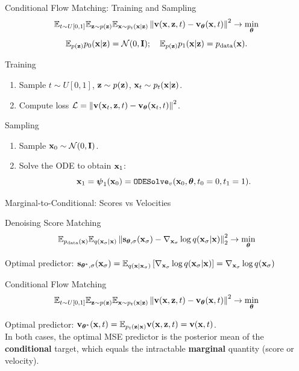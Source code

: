 \documentclass{beamer}
\renewcommand{\eqpause}{}
\begin{document}
\begin{frame}{Conditional Flow Matching: Training and Sampling}
	\[
		\mathbb{E}_{t \sim U[0, 1]} \mathbb{E}_{\mathbf{z} \sim p(\mathbf{z})} \mathbb{E}_{\mathbf{x} \sim p_t(\mathbf{x} | \mathbf{z})}\left\| \mathbf{v}(\mathbf{x}, \mathbf{z}, t) - \mathbf{v}_{\boldsymbol{\theta}}(\mathbf{x}, t) \right\|^2 \rightarrow \min_{\boldsymbol{\theta}}
	\]
	\[
		\mathbb{E}_{p(\mathbf{z})} p_0(\mathbf{x} | \mathbf{z}) = \mathcal{N}(0, \mathbf{I}); \quad \mathbb{E}_{p(\mathbf{z})} p_1(\mathbf{x} | \mathbf{z}) = p_{\text{data}}(\mathbf{x}).
	\]
	\eqpause
	\vspace{-0.3cm}
	\begin{block}{Training}
		\begin{enumerate}
			\item Sample $t \sim U[0, 1]$, $\mathbf{z} \sim p(\mathbf{z})$, $\mathbf{x}_t \sim p_t(\mathbf{x} | \mathbf{z})$.
			\item Compute loss $ \mathcal{L} = \left\| \mathbf{v}(\mathbf{x}_t, \mathbf{z}, t) - \mathbf{v}_{\boldsymbol{\theta}}(\mathbf{x}_t, t) \right\|^2 $.
		\end{enumerate}
	\end{block}
	\eqpause
	\begin{block}{Sampling}
		\begin{enumerate}
			\item Sample $\mathbf{x}_0 \sim \mathcal{N}(0, \mathbf{I})$.
			\item Solve the ODE to obtain $\mathbf{x}_1$:
			\vspace{-0.3cm}
			\[
				\mathbf{x}_1 = \boldsymbol{\psi}_1(\mathbf{x}_0) = \texttt{ODESolve}_v(\mathbf{x}_0, \boldsymbol{\theta}, t_0=0, t_1=1).
			\]
		\end{enumerate}
	\end{block}
\end{frame}
\begin{frame}{Marginal-to-Conditional: Scores vs Velocities}
	\begin{block}{Denoising Score Matching}
		\vspace{-0.3cm}
		\[
			\mathbb{E}_{p_{\text{data}}(\mathbf{x})} \mathbb{E}_{q(\mathbf{x}_{\sigma} | \mathbf{x})}\left\| \mathbf{s}_{\boldsymbol{\theta}, \sigma}(\mathbf{x}_{\sigma}) - \nabla_{\mathbf{x}_{\sigma}} \log q(\mathbf{x}_{\sigma} | \mathbf{x}) \right\|_2^2 \rightarrow \min_{\boldsymbol{\theta}}
		\]
		\vspace{-0.3cm}
	\end{block}
	Optimal predictor: $\mathbf{s}_{\boldsymbol{\theta}^*, \sigma}(\mathbf{x}_\sigma) = \mathbb{E}_{q(\mathbf{x} | \mathbf{x}_\sigma)} \left[\nabla_{\mathbf{x}_\sigma} \log q(\mathbf{x}_\sigma | \mathbf{x}) \right] = \nabla_{\mathbf{x}_\sigma} \log q(\mathbf{x}_\sigma)$
	\eqpause
	\begin{block}{Conditional Flow Matching}
		\vspace{-0.3cm}
		\[
			\mathbb{E}_{t \sim U[0, 1]} \mathbb{E}_{\mathbf{z} \sim p(\mathbf{z})} \mathbb{E}_{\mathbf{x} \sim p_t(\mathbf{x} | \mathbf{z})}\left\| \mathbf{v}(\mathbf{x}, \mathbf{z}, t) - \mathbf{v}_{\boldsymbol{\theta}}(\mathbf{x}, t) \right\|^2 \rightarrow \min_{\boldsymbol{\theta}}
		\]
		\vspace{-0.3cm}
	\end{block}
	Optimal predictor: $\mathbf{v}_{\boldsymbol{\theta}^*}(\mathbf{x}, t) = \mathbb{E}_{p_t(\mathbf{z} | \mathbf{x})} \mathbf{v}(\mathbf{x}, \mathbf{z}, t) = \mathbf{v}(\mathbf{x}, t)$. \\
	\eqpause
	\vspace{0.2cm}
	In both cases, the optimal MSE predictor is the posterior mean of the \textbf{conditional} target, which equals the intractable \textbf{marginal} quantity (score or velocity).
\end{frame}
\end{document}
